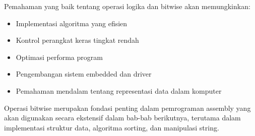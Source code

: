 \documentclass[../main.tex]{subfiles}
\begin{document}
Pemahaman yang baik tentang operasi logika dan bitwise akan memungkinkan:
\begin{itemize}
    \item Implementasi algoritma yang efisien
    \item Kontrol perangkat keras tingkat rendah
    \item Optimasi performa program
    \item Pengembangan sistem embedded dan driver
    \item Pemahaman mendalam tentang representasi data dalam komputer
\end{itemize}

Operasi bitwise merupakan fondasi penting dalam pemrograman assembly yang akan digunakan secara ekstensif dalam bab-bab berikutnya, terutama dalam implementasi struktur data, algoritma sorting, dan manipulasi string.

\end{document}
